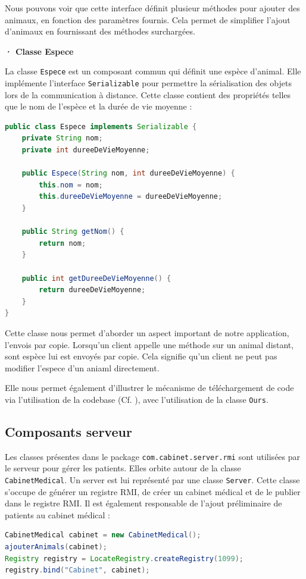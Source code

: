\documentclass{article} %
\begin{document}
Nous pouvons voir que cette interface définit plusieur méthodes pour ajouter des animaux,
en fonction des paramètres fournis. Cela permet de simplifier l'ajout d'animaux en fournissant
des méthodes surchargées.

\bigskip
\textbf{· Classe Espece}
\bigskip

La classe \texttt{Espece} est un composant commun qui définit une espèce d'animal. 
Elle implémente l'interface \texttt{Serializable} pour permettre la sérialisation 
des objets lors de la communication à distance. Cette classe contient des propriétés telles 
que le nom de l'espèce et la durée de vie moyenne :

\begin{lstlisting}[language=Java]
public class Espece implements Serializable {
    private String nom;
    private int dureeDeVieMoyenne;

    public Espece(String nom, int dureeDeVieMoyenne) {
        this.nom = nom;
        this.dureeDeVieMoyenne = dureeDeVieMoyenne;
    }

    public String getNom() {
        return nom;
    }

    public int getDureeDeVieMoyenne() {
        return dureeDeVieMoyenne;
    }
}
\end{lstlisting}

Cette classe nous permet d'aborder un aspect important de notre application, l'envois par copie.
Lorsqu'un client appelle une méthode sur un animal distant, sont espèce lui est envoyés par copie.
Cela signifie qu'un client ne peut pas modifier l'espece d'un aniaml directement.

Elle nous permet également d'illustrer le mécanisme de téléchargement de code
via l'utilisation de la codebase (Cf. ), 
avec l'utilisation de la classe \texttt{Ours}.


\subsection{Composants serveur}
Les classes présentes dans le package \texttt{com.cabinet.server.rmi} sont 
utilisées par le serveur pour gérer les patients. Elles orbite autour de la classe \texttt{CabinetMedical}.
Un server est lui représenté par une classe \texttt{Server}. Cette classe s'occupe de générer un registre RMI,
de créer un cabinet médical et de le publier dans le registre RMI.
Il est également responsable de l'ajout préliminaire de patients au cabinet médical : 

\begin{lstlisting}[language=Java]
CabinetMedical cabinet = new CabinetMedical();
ajouterAnimals(cabinet);
Registry registry = LocateRegistry.createRegistry(1099);
registry.bind("Cabinet", cabinet);
\end{lstlisting}
\end{document}
